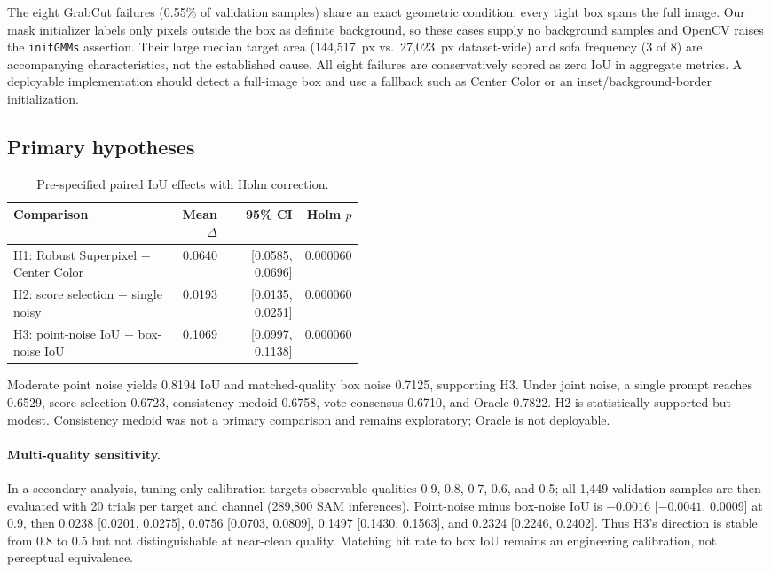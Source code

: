 The eight GrabCut failures (0.55\% of validation samples) share an exact geometric condition: every tight box spans the full image. Our mask initializer labels only pixels outside the box as definite background, so these cases supply no background samples and OpenCV raises the \texttt{initGMMs} assertion. Their large median target area (144,517~px vs.\ 27,023~px dataset-wide) and sofa frequency (3 of 8) are accompanying characteristics, not the established cause. All eight failures are conservatively scored as zero IoU in aggregate metrics. A deployable implementation should detect a full-image box and use a fallback such as Center Color or an inset/background-border initialization.

\subsection{Primary hypotheses}

\begin{table}[ht]
\centering
\caption{Pre-specified paired IoU effects with Holm correction.}
\begin{tabular}{p{0.46\linewidth}rrr}
\toprule
Comparison & Mean $\Delta$ & 95\% CI & Holm $p$ \\
\midrule
H1: Robust Superpixel $-$ Center Color & 0.0640 & [0.0585, 0.0696] & 0.000060 \\
H2: score selection $-$ single noisy & 0.0193 & [0.0135, 0.0251] & 0.000060 \\
H3: point-noise IoU $-$ box-noise IoU & 0.1069 & [0.0997, 0.1138] & 0.000060 \\
\bottomrule
\end{tabular}
\end{table}

Moderate point noise yields 0.8194 IoU and matched-quality box noise 0.7125, supporting H3. Under joint noise, a single prompt reaches 0.6529, score selection 0.6723, consistency medoid 0.6758, vote consensus 0.6710, and Oracle 0.7822. H2 is statistically supported but modest. Consistency medoid was not a primary comparison and remains exploratory; Oracle is not deployable.

\paragraph{Multi-quality sensitivity.}
In a secondary analysis, tuning-only calibration targets observable qualities 0.9, 0.8, 0.7, 0.6, and 0.5; all 1,449 validation samples are then evaluated with 20 trials per target and channel (289,800 SAM inferences). Point-noise minus box-noise IoU is $-0.0016$ [${-0.0041}$, 0.0009] at 0.9, then 0.0238 [0.0201, 0.0275], 0.0756 [0.0703, 0.0809], 0.1497 [0.1430, 0.1563], and 0.2324 [0.2246, 0.2402]. Thus H3's direction is stable from 0.8 to 0.5 but not distinguishable at near-clean quality. Matching hit rate to box IoU remains an engineering calibration, not perceptual equivalence.

